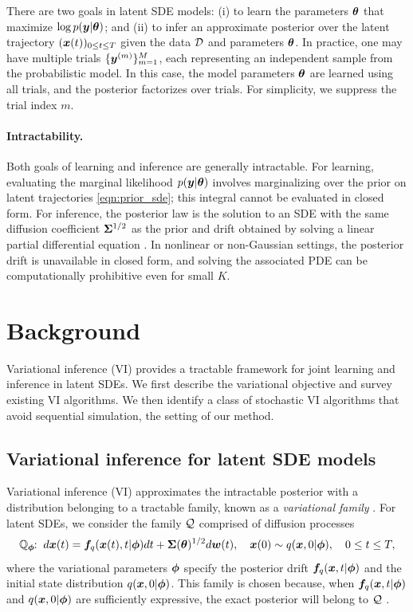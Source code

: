 There are two goals in latent SDE models: (i) to learn the parameters $\boldsymbol{\theta}$ that maximize $\log p(\boldsymbol{y} | \boldsymbol{\theta})$; and (ii) to infer an approximate posterior over the latent trajectory $(\boldsymbol{x}(t))_{0 \leq t \leq T}$ given the data $\mathcal{D}$ and parameters $\boldsymbol{\theta}$.
In practice, one may have multiple trials $\{\boldsymbol{y}^{(m)}\}_{m=1}^{M}$, each representing an independent sample from the probabilistic model. 
In this case, the model parameters $\boldsymbol{\theta}$ are learned using all trials, and the posterior factorizes over trials. For simplicity, we suppress the trial index $m$.

\paragraph{Intractability.}
Both goals of learning and inference are generally intractable. 
For learning, evaluating the marginal likelihood $p(\boldsymbol{y} | \boldsymbol{\theta})$
involves marginalizing over the prior on latent trajectories \eqref{eqn:prior_sde}; this integral cannot be evaluated in closed form.
For inference, the posterior law is the solution to an SDE with the same diffusion coefficient $\boldsymbol{\Sigma}^{1/2}$ as the prior and drift obtained by solving a linear partial differential equation \cite{kushner1964differential, stratonovich1965conditional, pardoux1982equations,archambeau2011approximate}. 
In nonlinear or non-Gaussian settings, the posterior drift is unavailable in closed form, and solving the associated PDE can be computationally prohibitive even for small $K$.

\section{Background}\label{sec:background}
Variational inference (VI) provides a tractable framework for joint learning and inference in latent SDEs. We first describe the variational objective and survey existing VI algorithms. We then identify a class of stochastic VI algorithms that avoid sequential simulation, the setting of our method.

\subsection{Variational inference for latent SDE models}\label{subsec:variational_inference}
Variational inference (VI) approximates the intractable posterior with a distribution belonging to a tractable family, known as a  \emph{variational family} \cite{jordan1999introduction, blei2017variational}. 
For latent SDEs, we consider the family $\mathcal{Q}$ comprised of diffusion processes
\begin{equation}\label{eqn:variational_family}
    \mathbb{Q}_{\boldsymbol{\phi}}\!\!:\; d \boldsymbol{x}(t) = \boldsymbol{f}_q(\boldsymbol{x}(t), t | \boldsymbol{\phi}) dt + \boldsymbol{\Sigma}(\boldsymbol{\theta})^{1/2} d\boldsymbol{w}(t), \quad \boldsymbol{x}(0) \sim q(\boldsymbol{x}, 0 | \boldsymbol{\phi}), \quad 0 \leq t \leq T,
\end{equation}
where the variational parameters $\boldsymbol{\phi}$ specify the posterior drift $\boldsymbol{f}_q(\boldsymbol{x}, t| \boldsymbol{\phi})$ and the initial state distribution $q(\boldsymbol{x}, 0 | \boldsymbol{\phi})$.
This family is chosen because, when $\boldsymbol{f}_q(\boldsymbol{x}, t | \boldsymbol{\phi})$ and $q(\boldsymbol{x}, 0 | \boldsymbol{\phi})$ are sufficiently expressive,
the exact posterior will belong to $\mathcal{Q}$ \citep[see, e.g.,][]{hu2025sing}.

